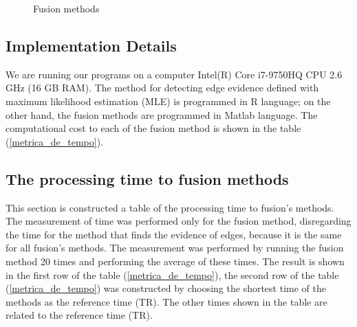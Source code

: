 \documentclass[conference]{IEEEtran}
\begin{document}
\begin{figure}[hbt]
{     }
     \caption{Fusion methods}
     \label{fusion_met}
\end{figure}

\subsection{Implementation Details}
We are running our programs on a computer Intel(R) Core i7-9750HQ CPU 2.6 GHz (16 GB RAM).  The method for detecting edge evidence defined with maximum likelihood estimation (MLE) is programmed in R language; on the other hand, the fusion methods are programmed in Matlab language. The computational cost to each of the fusion method is shown in the table (\ref{metrica_de_tempo}).

\subsection{The processing time to fusion methods} 

This section is constructed a table of the processing time to fusion's methods. The measurement of time was performed only for the fusion method, disregarding the time for the method that finds the evidence of edges, because it is the same for all fusion's methods. The measurement was performed by running the fusion method 20 times and performing the average of these times. The result is shown in the first row of the table (\ref{metrica_de_tempo}), the second row of the table  (\ref{metrica_de_tempo}) was constructed by choosing the shortest time of the methods as the reference time (TR). The other times shown in the table are related to the reference time (TR).   
\end{document}
